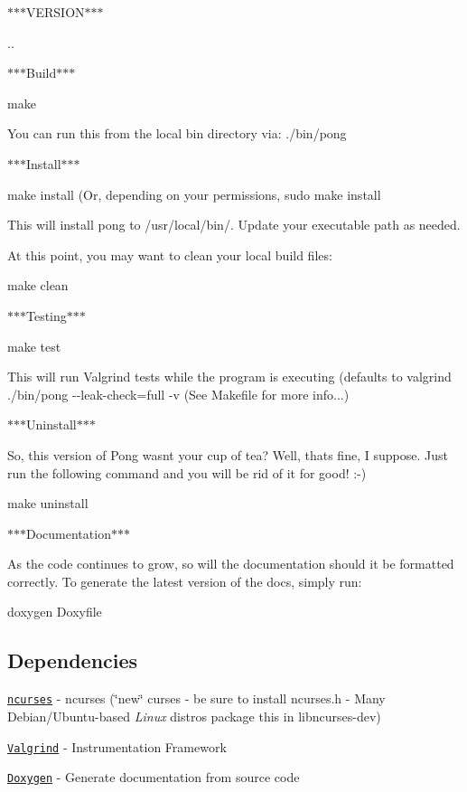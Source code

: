 $\ast$$\ast$$\ast$\+V\+E\+R\+S\+I\+O\+N$\ast$$\ast$$\ast$

{..}

$\ast$$\ast$$\ast$\+Build$\ast$$\ast$$\ast$

{\ttfamily make}

You can run this from the local {\ttfamily bin} directory via\+: {\ttfamily ./bin/pong}

$\ast$$\ast$$\ast$\+Install$\ast$$\ast$$\ast$

{\ttfamily make install} (Or, depending on your permissions, {\ttfamily sudo make install}

This will install {\ttfamily pong} to {\ttfamily /usr/local/bin/}. Update your executable path as needed.

At this point, you may want to clean your local build files\+:

{\ttfamily make clean}

$\ast$$\ast$$\ast$\+Testing$\ast$$\ast$$\ast$

{\ttfamily make test}

This will run Valgrind tests while the program is executing (defaults to {\ttfamily valgrind ./bin/pong -\/-\/leak-\/check=full -\/v} (See {\ttfamily Makefile} for more info...)

$\ast$$\ast$$\ast$\+Uninstall$\ast$$\ast$$\ast$

So, this version of Pong wasn\textquotesingle{}t your cup of tea? Well, that\textquotesingle{}s fine, I suppose. Just run the following command and you will be rid of it for good! \+:-\/)

{\ttfamily make uninstall}

$\ast$$\ast$$\ast$\+Documentation$\ast$$\ast$$\ast$

As the code continues to grow, so will the documentation should it be formatted correctly. To generate the latest version of the docs, simply run\+:

{\ttfamily doxygen Doxyfile}

\subsection*{Dependencies}


\begin{DoxyItemize}
\item \href{https://www.gnu.org/software/ncurses/}{\tt ncurses} -\/ ncurses (\char`\"{}new\char`\"{} curses -\/ be sure to install {\ttfamily ncurses.\+h} -\/ Many Debian/\+Ubuntu-\/based {\itshape Linux} distros package this in libncurses-\/dev)
\item \href{http://valgrind.org/}{\tt Valgrind} -\/ Instrumentation Framework
\item \href{http://www.stack.nl/~dimitri/doxygen/}{\tt Doxygen} -\/ Generate documentation from source code
\end{DoxyItemize}

